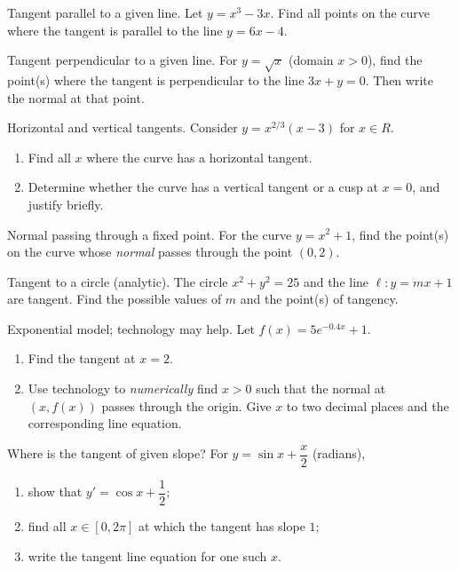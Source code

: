 \documentclass[11pt]{article}
\def\textbf#1{#1}%
\def\mathbb#1{#1}%
\newcounter{question}
\begin{document}
\begin{question}
\textbf{Tangent parallel to a given line.}
Let $y=x^3-3x$. Find all points on the curve where the tangent is parallel to the line $y=6x-4$.
\end{question}

\begin{question}
\textbf{Tangent perpendicular to a given line.}
For $y=\sqrt{x}$ (domain $x>0$), find the point(s) where the tangent is perpendicular to the line $3x+y=0$. Then write the normal at that point.
\end{question}

\begin{question}
\textbf{Horizontal and vertical tangents.}
Consider $y=x^{2/3}(x-3)$ for $x\in\mathbb R$.
\begin{enumerate}
  \item Find all $x$ where the curve has a horizontal tangent.
  \item Determine whether the curve has a vertical tangent or a cusp at $x=0$, and justify briefly.
\end{enumerate}
\end{question}

\begin{question}
\textbf{Normal passing through a fixed point.}
For the curve $y=x^2+1$, find the point(s) on the curve whose \emph{normal} passes through the point $(0,2)$.
\end{question}

\begin{question}
\textbf{Tangent to a circle (analytic).}
The circle $x^2+y^2=25$ and the line $\ell: y=mx+1$ are tangent. Find the possible values of $m$ and the point(s) of tangency.
\end{question}

\begin{question}
\textbf{Exponential model; technology may help.}
Let $f(x)=5e^{-0.4x}+1$. 
\begin{enumerate}
  \item Find the tangent at $x=2$.
  \item Use technology to \emph{numerically} find $x>0$ such that the normal at $(x,f(x))$ passes through the origin. Give $x$ to two decimal places and the corresponding line equation.
\end{enumerate}
\end{question}

\begin{question}
\textbf{Where is the tangent of given slope?}
For $y=\sin x+\dfrac{x}{2}$ (radians),
\begin{enumerate}
  \item show that $y'= \cos x+\dfrac12$;
  \item find all $x\in[0,2\pi]$ at which the tangent has slope $1$;
  \item write the tangent line equation for one such $x$.
\end{enumerate}
\end{question}
\end{document}
